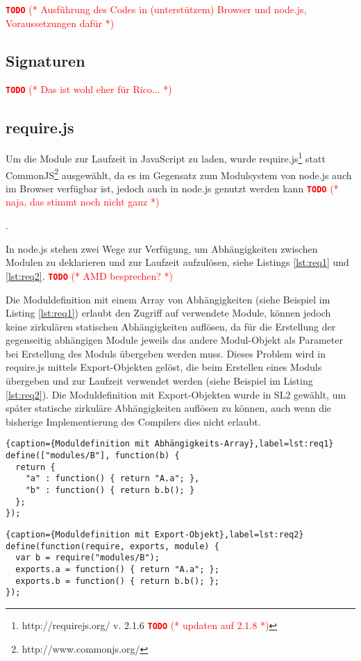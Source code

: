 \documentclass{llncs}
\newcommand{\TODO}[1]{ \textcolor{red}{\textbf{\texttt{\large{TODO}}} (* #1 *)}\par}
\begin{document}
\TODO{Ausführung des Codes in (unterstützem) Browser und node.js,
Voraussetzungen dafür}

\subsection{Signaturen}
\label{sec:compSig}
\TODO{Das ist wohl eher für Rico...}

\subsection{require.js}
\label{sec:compReq}

Um die Module zur Laufzeit in JavaScript zu laden, wurde
require.js\footnote{http://requirejs.org/ v. 2.1.6 \TODO{updaten auf 2.1.8}}
statt CommonJS\footnote{http://www.commonjs.org/} ausgewählt, da es im
Gegensatz zum Modulsystem von node.js auch im Browser verfügbar ist,
jedoch auch in node.js genutzt werden kann\TODO{naja, das stimmt noch nicht ganz}.

In node.js stehen zwei Wege zur Verfügung, um Abhängigkeiten zwischen
Modulen zu deklarieren und zur Laufzeit aufzulösen, siehe Listings
\ref{lst:req1} und \ref{lst:req2}. \TODO{AMD besprechen?} Die
Moduldefinition mit einem Array von Abhängigkeiten (siehe Beispiel im
Listing \ref{lst:req1}) erlaubt den Zugriff auf verwendete Module,
können jedoch keine zirkulären statischen Abhängigkeiten auflösen, da
für die Erstellung der gegenseitig abhängigen Module jeweils das
andere Modul-Objekt als Parameter bei Erstellung des Moduls übergeben
werden muss. Dieses Problem wird in require.js mittels
Export-Objekten gelöst, die beim Erstellen eines Moduls übergeben und
zur Laufzeit verwendet werden (siehe Beispiel im Listing
\ref{lst:req2}). Die Moduldefinition mit Export-Objekten wurde in SL2
gewählt, um später statische zirkuläre Abhängigkeiten auflösen zu
können, auch wenn die bisherige Implementierung des Compilers dies
nicht erlaubt.

\begin{lstlisting}{caption={Moduldefinition mit Abhängigkeits-Array},label=lst:req1}
define(["modules/B"], function(b) {
  return {
    "a" : function() { return "A.a"; },
    "b" : function() { return b.b(); }
  };
});
\end{lstlisting}

\begin{lstlisting}{caption={Moduldefinition mit Export-Objekt},label=lst:req2}
define(function(require, exports, module) {
  var b = require("modules/B");
  exports.a = function() { return "A.a"; };
  exports.b = function() { return b.b(); };
});
\end{lstlisting}
\end{document}
